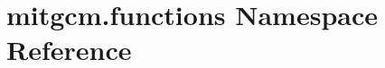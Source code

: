 \hypertarget{namespacemitgcm_1_1functions}{\section{mitgcm.\+functions Namespace Reference}
\label{namespacemitgcm_1_1functions}
}
